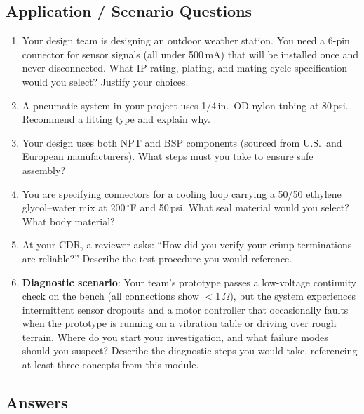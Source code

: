 \documentclass[11pt,letterpaper,twoside,openany]{book}
\begin{document}
\subsection{Application / Scenario Questions}

\begin{enumerate}[resume,leftmargin=1.5em]
  \item Your design team is designing an outdoor weather station. You need a 6-pin connector for sensor signals (all under 500\,mA) that will be installed once and never disconnected. What IP rating, plating, and mating-cycle specification would you select? Justify your choices.

  \item A pneumatic system in your project uses 1/4\,in.\ OD nylon tubing at 80\,psi. Recommend a fitting type and explain why.

  \item Your design uses both NPT and BSP components (sourced from U.S.\ and European manufacturers). What steps must you take to ensure safe assembly?

  \item You are specifying connectors for a cooling loop carrying a 50/50 ethylene glycol--water mix at 200\,$^{\circ}$F and 50\,psi. What seal material would you select? What body material?

  \item At your CDR, a reviewer asks: ``How did you verify your crimp terminations are reliable?'' Describe the test procedure you would reference.

  \item \textbf{Diagnostic scenario}: Your team's prototype passes a low-voltage continuity check on the bench (all connections show $<$1\,$\Omega$), but the system experiences intermittent sensor dropouts and a motor controller that occasionally faults when the prototype is running on a vibration table or driving over rough terrain. Where do you start your investigation, and what failure modes should you suspect? Describe the diagnostic steps you would take, referencing at least three concepts from this module.
\end{enumerate}


\newpage
\subsection{Answers}
\end{document}
